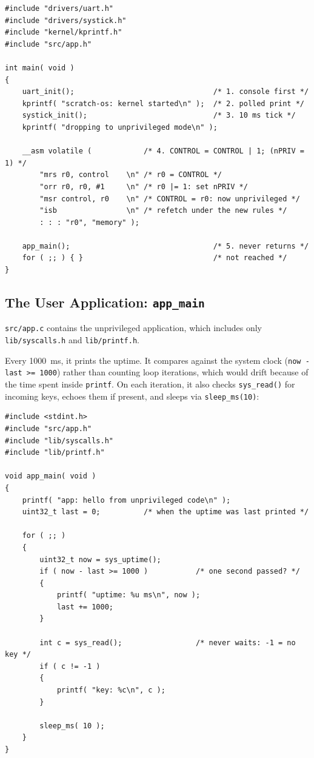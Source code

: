 \begin{lstlisting}
#include "drivers/uart.h"
#include "drivers/systick.h"
#include "kernel/kprintf.h"
#include "src/app.h"

int main( void )
{
    uart_init();                                /* 1. console first */
    kprintf( "scratch-os: kernel started\n" );  /* 2. polled print */
    systick_init();                             /* 3. 10 ms tick */
    kprintf( "dropping to unprivileged mode\n" );
    
    __asm volatile (            /* 4. CONTROL = CONTROL | 1; (nPRIV = 1) */
        "mrs r0, control    \n" /* r0 = CONTROL */
        "orr r0, r0, #1     \n" /* r0 |= 1: set nPRIV */
        "msr control, r0    \n" /* CONTROL = r0: now unprivileged */
        "isb                \n" /* refetch under the new rules */
        : : : "r0", "memory" );
        
    app_main();                                 /* 5. never returns */
    for ( ;; ) { }                              /* not reached */
}
\end{lstlisting}

\subsection{The User Application: \texttt{app\_main}}
\texttt{src/app.c} contains the unprivileged application, which includes only \texttt{lib/syscalls.h} and \texttt{lib/printf.h}.

Every 1000~ms, it prints the uptime. It compares against the system clock (\texttt{now - last >= 1000}) rather than counting loop iterations, which would drift because of the time spent inside \texttt{printf}. On each iteration, it also checks \texttt{sys\_read()} for incoming keys, echoes them if present, and sleeps via \texttt{sleep\_ms(10)}:

\begin{lstlisting}
#include <stdint.h>
#include "src/app.h"
#include "lib/syscalls.h"
#include "lib/printf.h"

void app_main( void )
{
    printf( "app: hello from unprivileged code\n" );
    uint32_t last = 0;          /* when the uptime was last printed */

    for ( ;; )
    {
        uint32_t now = sys_uptime();
        if ( now - last >= 1000 )           /* one second passed? */
        {
            printf( "uptime: %u ms\n", now );
            last += 1000;
        }

        int c = sys_read();                 /* never waits: -1 = no key */
        if ( c != -1 )
        {
            printf( "key: %c\n", c );
        }

        sleep_ms( 10 );
    }
}
\end{lstlisting}

